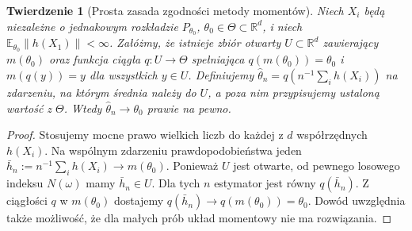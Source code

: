 \documentclass[11pt,a4paper,oneside]{report}
\numberwithin{equation}{chapter}
\theoremstyle{plain}
\newtheorem{twierdzenie}{Twierdzenie}[chapter]
\theoremstyle{definition}
\theoremstyle{remark}
\newcommand{\R}{\mathbb R}
\newcommand{\E}{\mathbb E}
\begin{document}
\begin{twierdzenie}[Prosta zasada zgodności metody momentów]
\label{thm:mom-consistency}
Niech $X_i$ będą niezależne o jednakowym rozkładzie $P_{\theta_0}$,
$\theta_0\in\Theta\subset\R^d$, i niech $\E_{\theta_0}\|h(X_1)\|<\infty$.
Załóżmy, że istnieje zbiór otwarty $U\subset\R^d$ zawierający
$m(\theta_0)$ oraz funkcja ciągła $q:U\to\Theta$ spełniająca
$q(m(\theta_0))=\theta_0$ i $m(q(y))=y$ dla wszystkich $y\in U$.
Definiujemy $\widehat\theta_n=q(n^{-1}\sum_i h(X_i))$ na zdarzeniu,
na którym średnia należy do $U$, a poza nim przypisujemy ustaloną
wartość z $\Theta$. Wtedy $\widehat\theta_n\to\theta_0$ prawie na pewno.
\end{twierdzenie}
\begin{proof}
Stosujemy mocne prawo wielkich liczb do każdej z $d$ współrzędnych
$h(X_i)$. Na wspólnym zdarzeniu prawdopodobieństwa jeden
$\bar h_n:=n^{-1}\sum_i h(X_i)\to m(\theta_0)$.
Ponieważ $U$ jest otwarte, od pewnego losowego indeksu $N(\omega)$
mamy $\bar h_n\in U$. Dla tych $n$ estymator jest równy
$q(\bar h_n)$. Z ciągłości $q$ w $m(\theta_0)$ dostajemy
$q(\bar h_n)\to q(m(\theta_0))=\theta_0$. Dowód uwzględnia
także możliwość, że dla małych prób układ momentowy nie ma rozwiązania.
\end{proof}
\end{document}
